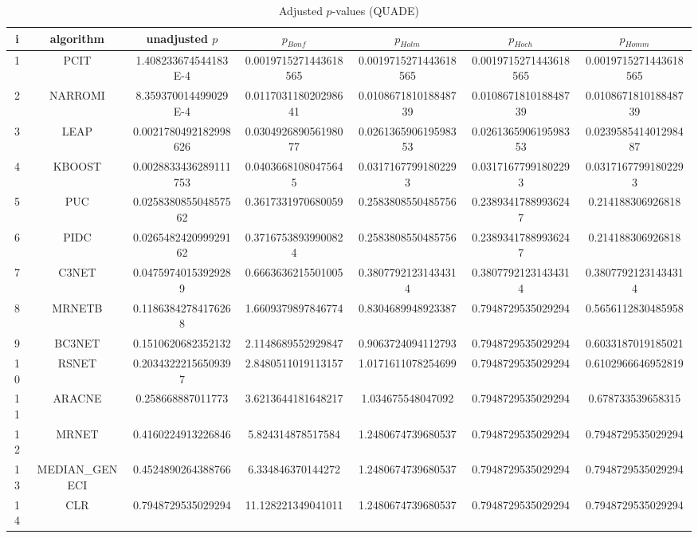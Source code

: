 \documentclass[a4paper,10pt]{article}
\begin{document}
\begin{landscape}
\begin{table}[!htp]
\centering\scriptsize
\caption{Adjusted $p$-values (QUADE)}
\begin{tabular}{ccccccc}
i&algorithm&unadjusted $p$&$p_{Bonf}$&$p_{Holm}$&$p_{Hoch}$&$p_{Homm}$\\
\hline
1&PCIT&1.408233674544183E-4&0.0019715271443618565&0.0019715271443618565&0.0019715271443618565&0.0019715271443618565\\
2&NARROMI&8.359370014499029E-4&0.011703118020298641&0.010867181018848739&0.010867181018848739&0.010867181018848739\\
3&LEAP&0.0021780492182998626&0.030492689056198077&0.026136590619598353&0.026136590619598353&0.023958541401298487\\
4&KBOOST&0.0028833436289111753&0.04036681080475645&0.03171677991802293&0.03171677991802293&0.03171677991802293\\
5&PUC&0.025838085504857562&0.3617331970680059&0.2583808550485756&0.23893417889936247&0.214188306926818\\
6&PIDC&0.026548242099929162&0.37167538939900824&0.2583808550485756&0.23893417889936247&0.214188306926818\\
7&C3NET&0.04759740153929289&0.6663636215501005&0.38077921231434314&0.38077921231434314&0.38077921231434314\\
8&MRNETB&0.11863842784176268&1.6609379897846774&0.8304689948923387&0.7948729535029294&0.5656112830485958\\
9&BC3NET&0.1510620682352132&2.1148689552929847&0.9063724094112793&0.7948729535029294&0.6033187019185021\\
10&RSNET&0.20343222156509397&2.8480511019113157&1.0171611078254699&0.7948729535029294&0.6102966646952819\\
11&ARACNE&0.258668887011773&3.6213644181648217&1.034675548047092&0.7948729535029294&0.678733539658315\\
12&MRNET&0.4160224913226846&5.824314878517584&1.2480674739680537&0.7948729535029294&0.7948729535029294\\
13&MEDIAN_GENECI&0.4524890264388766&6.334846370144272&1.2480674739680537&0.7948729535029294&0.7948729535029294\\
14&CLR&0.7948729535029294&11.128221349041011&1.2480674739680537&0.7948729535029294&0.7948729535029294\\
\hline
\end{tabular}
\end{table}


\end{landscape}
\end{document}
